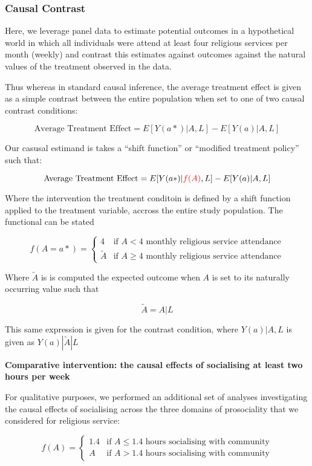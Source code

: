 \documentclass[
  singlecolumn]{article}
\begin{document}
\subsubsection{Causal Contrast}\label{causal-contrast}

Here, we leverage panel data to estimate potential outcomes in a
hypothetical world in which all individuals were attend at least four
religious services per month (weekly) and contrast this estimates
against outcomes against the natural values of the treatment observed in
the data.

Thus whereas in standard causal inference, the average treatment effect
is given as a simple contrast between the entire population when set to
one of two causal contrast conditions:

\[ \text{Average Treatment Effect} = E[Y(a*)|A,L] - E[Y(a)|A,L] \]

Our casusal estimand is takes a ``shift function'' or ``modified
treatment policy'' such that:

\[ \text{Average Treatment Effect} = E[Y(a*)|\textcolor{red}{f(A)},L] - E[Y(a)|A,L] \]

Where the intervention the treatment conditoin is defined by a shift
function applied to the treatment variable, accross the entire study
population. The functional can be stated

\[f(A = a*) = \begin{cases} 4 & \text{if } A < 4  \text{ monthly religious service attendance} \\ \tilde{A} & \text{if } A \geq 4  \text{ monthly religious service attendance} \end{cases} \]

Where \(\tilde{A}\) is is computed the expected outcome when \(A\) is
set to its naturally occurring value such that

\[\tilde{A} = A|L\]

This same expression is given for the contrast condition, where
\(Y(a)|A,L\) is given as \(Y(a)|\tilde{A}|L\)

\textbf{Comparative intervention: the causal effects of socialising at
least two hours per week}

For qualitative purposes, we performed an additional set of analyses
investigating the causal effects of socialising across the three domains
of prosociality that we considered for religious service:

\[f(A) = \begin{cases} 1.4 & \text{if } A \leq 1.4 \text{ hours socialising with community} \\ A & \text{if } A >  1.4  \text{ hours socialising with community}  \end{cases} \]
\end{document}
